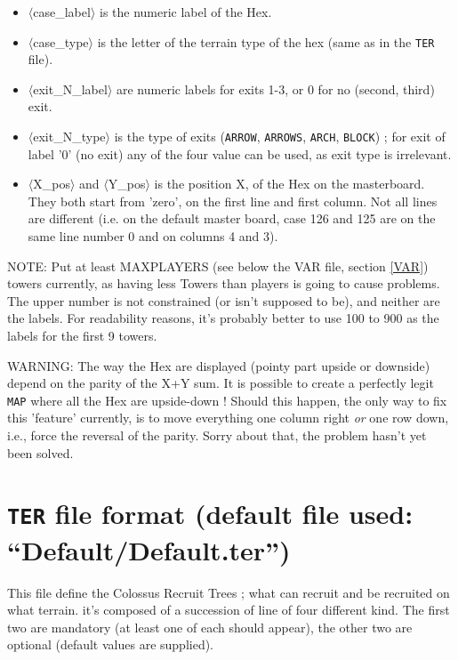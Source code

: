 \documentclass{article}
\begin{document}
\begin{itemize}
\item $\langle$case\_label$\rangle$ is the numeric label of the Hex.
\item $\langle$case\_type$\rangle$ is the letter of the terrain type of the hex (same as in the \texttt{TER} file).
\item $\langle$exit\_N\_label$\rangle$ are numeric labels for exits 1-3, or 0 for no (second, third) exit.
\item $\langle$exit\_N\_type$\rangle$ is the type of exits (\texttt{ARROW}, \texttt{ARROWS}, \texttt{ARCH}, \texttt{BLOCK}) ; for exit of label '0' (no exit) any of the four value can be used, as exit type is irrelevant.
\item $\langle$X\_pos$\rangle$ and $\langle$Y\_pos$\rangle$ is the position X, of the Hex on the masterboard. They both start from 'zero', on the first line and first column. Not all lines are different (i.e. on the default master board, case 126 and 125 are on the same line number 0 and on columns 4 and 3).
\end{itemize}

NOTE: Put at least MAXPLAYERS (see below the VAR file, section \ref{VAR}) towers currently, as having less Towers than players is going to cause problems. The upper number is not constrained (or isn't supposed to be), and neither are the labels. For readability reasons, it's probably better to use 100 to 900 as the labels for the first 9 towers.

WARNING: The way the Hex are displayed (pointy part upside or downside) depend on the parity of the X+Y sum. It is possible to create a perfectly legit \texttt{MAP} where all the Hex are upside-down ! Should this happen, the only way to fix this 'feature' currently, is to move everything one column right \emph{or} one row down, i.e., force the reversal of the parity. Sorry about that, the problem hasn't yet been solved.

\section{\texttt{TER} file format (default file used: ``Default/Default.ter'')}
\label{TER}

This file define the Colossus Recruit Trees ; what can recruit and be recruited on what terrain. it's composed of a succession of line of four different kind.
The first two are mandatory (at least one of each should appear), the other two are optional (default values are supplied).
\end{document}
